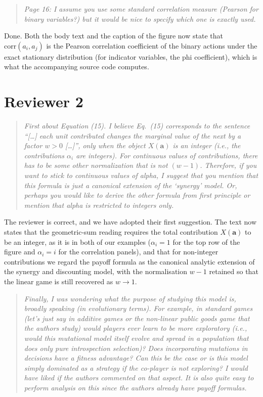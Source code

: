 \documentclass[11pt]{article}
\newenvironment{reviewerquote}
  {\begin{quote}\itshape}
  {\end{quote}}
\begin{document}
\begin{reviewerquote}
Page 16: I assume you use some standard correlation measure (Pearson for
binary variables?) but it would be nice to specify which one is exactly
used.
\end{reviewerquote}

Done. Both the body text and the caption of the figure now state that
\(\mathrm{corr}(a_i,a_j)\) is the Pearson correlation coefficient of the
binary actions under the exact stationary distribution (for indicator
variables, the phi coefficient), which is what the accompanying source
code computes.

\section*{Reviewer 2}

\begin{reviewerquote}
First about Equation (15). I believe Eq.\ (15) corresponds to the
sentence ``[\ldots] each unit contributed changes the marginal value of
the next by a factor \(w > 0\) [\ldots]'', only when the object
\(X(\mathbf{a})\) is an integer (i.e., the contributions \(\alpha_i\) are
integers). For continuous values of contributions, there has to be some
other normalization that is not \((w-1)\). Therefore, if you want to
stick to continuous values of alpha, I suggest that you mention that this
formula is just a canonical extension of the `synergy' model. Or, perhaps
you would like to derive the other formula from first principle or
mention that alpha is restricted to integers only.
\end{reviewerquote}

The reviewer is correct, and we have adopted their first suggestion. The
text now states that the geometric-sum reading requires the total
contribution \(X(\mathbf{a})\) to be an integer, as it is in both of our
examples (\(\alpha_i=1\) for the top row of the figure and
\(\alpha_i=i\) for the correlation panels), and that for non-integer
contributions we regard the payoff formula as the canonical analytic
extension of the synergy and discounting model, with the normalisation
\(w-1\) retained so that the linear game is still recovered as
\(w\to1\).

\begin{reviewerquote}
Finally, I was wondering what the purpose of studying this model is,
broadly speaking (in evolutionary terms). For example, in standard games
(let's just say in additive games or the non-linear public goods game
that the authors study) would players ever learn to be more exploratory
(i.e., would this mutational model itself evolve and spread in a
population that does only pure introspection selection)? Does
incorporating mutations in decisions have a fitness advantage? Can this
be the case or is this model simply dominated as a strategy if the
co-player is not exploring? I would have liked if the authors commented
on that aspect. It is also quite easy to perform analysis on this since
the authors already have payoff formulas.
\end{reviewerquote}
\end{document}

